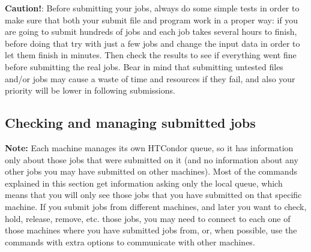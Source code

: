 \documentclass[a4paper,10pt]{article}
\begin{document}
\begin{mdframed}
\textbf{Caution!}: Before submitting your jobs, always do some simple tests in
order to make sure that both your submit file and program work in a proper way:
if you are going to submit hundreds of jobs and each job takes several hours to
finish, before doing that try with just a few jobs and change the input data in
order to let them finish in minutes. Then check the results to see if everything
went fine before submitting the real jobs. Bear in mind that submitting untested
files and/or jobs may cause a waste of time and resources if they fail, and also
your priority will be lower in following submissions. 
\end{mdframed}


\subsection{Checking and managing submitted jobs}
\label{sec:org59fc859}

\begin{mdframed}
\textbf{Note:} Each machine manages its own HTCondor queue, so it has information only
about those jobs that were submitted on it (and no information about any other
jobs you may have submitted on other machines). Most of the commands explained
in this section get information asking only the local queue, which means that
you will only see those jobs that you have submitted on that specific
machine. If you submit jobs from different machines, and later you want to
check, hold, release, remove, etc. those jobs, you may need to connect to each
one of those machines where you have submitted jobs from, or, when possible, use
the commands with extra options to communicate with other machines.
\end{mdframed}
\end{document}
